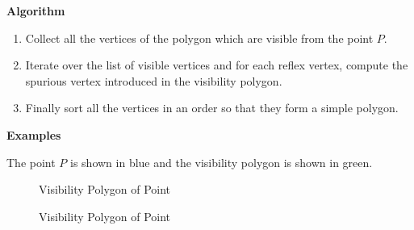 {\bf Algorithm}

\begin{enumerate}
 \item 
Collect all the vertices of the polygon which are visible from the point $P$.
\item
Iterate over the list of visible vertices and for each reflex vertex, compute the spurious vertex introduced in the visibility polygon.
\item
Finally sort all the vertices in an order so that they form a simple polygon.
\end{enumerate}

{\bf Examples}

The point $P$ is shown in blue and the visibility polygon is shown in green.

\begin{figure}[h]
\begin{center}
\caption{\label{fig:Visibility Polygon of Point}Visibility Polygon of Point}
\end{center}
\end{figure}


\begin{figure}[h]
\begin{center}
\caption{\label{fig:Visibility Polygon of Point}Visibility Polygon of Point}
\end{center}
\end{figure}









